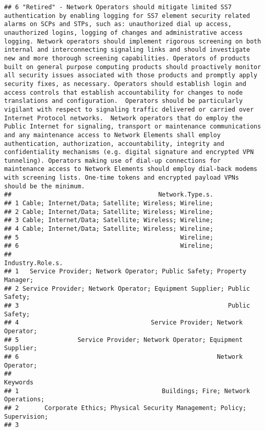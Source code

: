 \documentclass[
]{article}
\begin{document}
\begin{verbatim}
## 6 "Retired" - Network Operators should mitigate limited SS7 authentication by enabling logging for SS7 element security related alarms on SCPs and STPs, such as: unauthorized dial up access, unauthorized logins, logging of changes and administrative access logging. Network operators should implement rigorous screening on both internal and interconnecting signaling links and should investigate new and more thorough screening capabilities. Operators of products built on general purpose computing products should proactively monitor all security issues associated with those products and promptly apply security fixes, as necessary. Operators should establish login and access controls that establish accountability for changes to node translations and configuration.  Operators should be particularly vigilant with respect to signaling traffic delivered or carried over Internet Protocol networks.  Network operators that do employ the Public Internet for signaling, transport or maintenance communications and any maintenance access to Network Elements shall employ authentication, authorization, accountability, integrity and confidentiality mechanisms (e.g. digital signature and encrypted VPN tunneling). Operators making use of dial-up connections for maintenance access to Network Elements should employ dial-back modems with screening lists. One-time tokens and encrypted payload VPNs should be the minimum.
##                                        Network.Type.s.
## 1 Cable; Internet/Data; Satellite; Wireless; Wireline;
## 2 Cable; Internet/Data; Satellite; Wireless; Wireline;
## 3 Cable; Internet/Data; Satellite; Wireless; Wireline;
## 4 Cable; Internet/Data; Satellite; Wireless; Wireline;
## 5                                            Wireline;
## 6                                            Wireline;
##                                                         Industry.Role.s.
## 1   Service Provider; Network Operator; Public Safety; Property Manager;
## 2 Service Provider; Network Operator; Equipment Supplier; Public Safety;
## 3                                                         Public Safety;
## 4                                    Service Provider; Network Operator;
## 5                Service Provider; Network Operator; Equipment Supplier;
## 6                                                      Network Operator;
##                                                                     Keywords
## 1                                       Buildings; Fire; Network Operations;
## 2       Corporate Ethics; Physical Security Management; Policy; Supervision;
## 3                                                                           

\end{verbatim}
\end{document}
